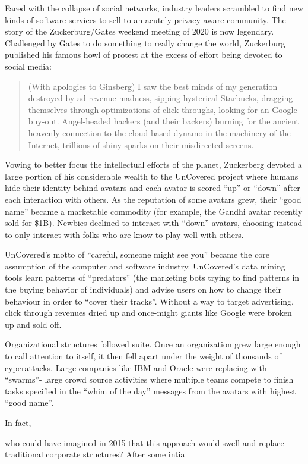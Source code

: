 \documentclass[journal]{IEEEtran}
\begin{document}
Faced with the collapse of social networks, industry leaders scrambled
to find new kinds of software services to sell to an acutely privacy-aware
community.
The story of the Zuckerburg/Gates weekend meeting of 2020 is now legendary.
Challenged by Gates to do something to really change the world, Zuckerburg published his famous howl of protest at the excess of effort being devoted to
social media:
\begin{quote}
(With apologies to Ginsberg) I saw the best minds of my generation destroyed by ad revenue madness, sipping hysterical Starbucks, dragging themselves through optimizations of click-throughs, looking for an Google buy-out. Angel-headed hackers (and their backers) burning for the ancient heavenly connection to the cloud-based dynamo in the machinery of the Internet, trillions of shiny sparks on their misdirected screens.
\end{quote}
Vowing to better focus the intellectual efforts of the planet, 
Zuckerberg devoted a large portion of his considerable wealth to the UnCovered
project where humans hide their identity  behind avatars and each avatar is
scored ``up'' or ``down'' after each interaction with others. As the reputation of some avatars grew, their ``good name'' became a marketable  commodity (for example, the Gandhi avatar recently sold for \$1B). Newbies declined to interact with ``down'' avatars, choosing instead to only interact with folks who are know to play well with others. 

UnCovered's motto of ``careful, someone might see you'' became the core assumption of the computer and software industry. UnCovered's  data mining tools  learn  patterns of ``predators'' (the marketing bots trying to find  patterns in the buying behavior of individuals) and advise users on how to change
their behaviour in order to  ``cover their tracks''.
Without a way to target advertising, click through revenues dried up and once-might giants like Google were broken up and sold off. 


Organizational structures followed suite. Once an organization grew large enough to call attention to itself, it then fell apart under the weight of thousands of cyperattacks. Large companies
like  IBM and Oracle were replacing with ``swarms''-
large crowd source activities where multiple teams compete to finish tasks specified in the ``whim of the day'' messages from   the avatars
with highest ``good name''.

In fact, 

who could have imagined in 2015 that this approach would swell and replace traditional corporate structures? After some intial 
\end{document}
